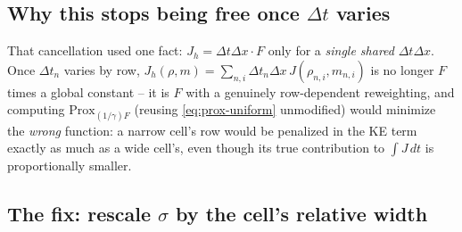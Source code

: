 \documentclass[11pt]{article}
\newcommand{\dt}{\Delta t}
\newcommand{\dx}{\Delta x}
\begin{document}
\subsection*{Why this stops being free once $\dt$ varies}

That cancellation used one fact: $J_h=\dt\dx\cdot F$ only for a \emph{single shared} $\dt\dx$.
Once $\dt_n$ varies by row, $J_h(\rho,m)=\sum_{n,i}\dt_n\dx\,J(\rho_{n,i},m_{n,i})$ is no longer
$F$ times a global constant -- it is $F$ with a genuinely row-dependent reweighting, and
computing $\mathrm{Prox}_{(1/\gamma)F}$ (reusing \eqref{eq:prox-uniform} unmodified) would
minimize the \emph{wrong} function: a narrow cell's row would be penalized in the KE term exactly
as much as a wide cell's, even though its true contribution to $\int J\,dt$ is proportionally
smaller.

\subsection*{The fix: rescale $\sigma$ by the cell's relative width}
\end{document}
